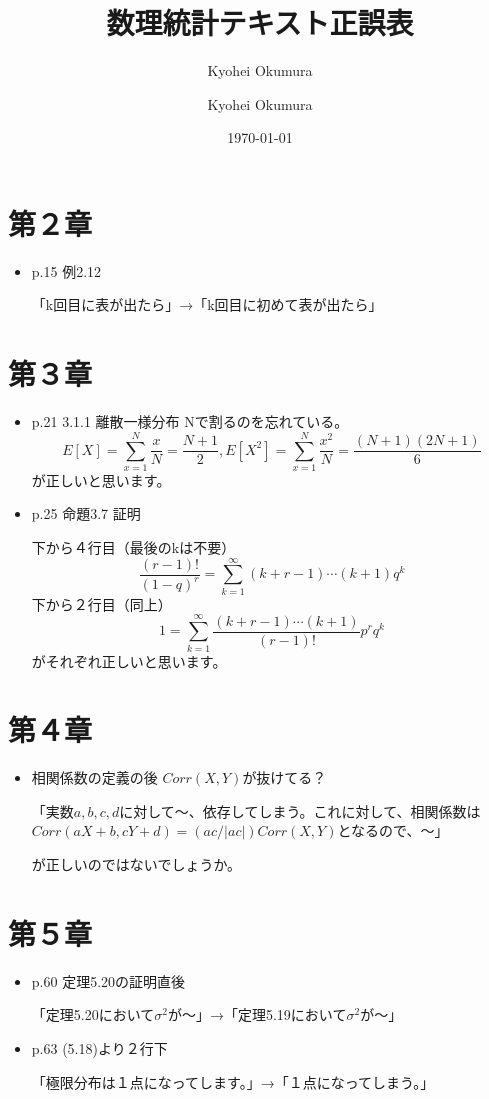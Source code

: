 \documentclass[11pt,a4paper]{article}
\author{Kyohei Okumura}
\begin{document}
\title{数理統計テキスト正誤表}
\author{Kyohei Okumura}
\date{\today}
\maketitle

\section*{第２章}

\begin{itemize}
\item p.15 例2.12

「k回目に表が出たら」→「k回目に初めて表が出たら」
\end{itemize}

\section*{第３章}
\begin{itemize}

\item p.21 3.1.1 離散一様分布 Nで割るのを忘れている。
$$E[X] = \displaystyle{\sum_{x=1}^N {\frac{x}{N}} = \frac{N+1}{2}, E[X^2] = \sum_{x=1}^N \frac{x^2}{N} = \frac{(N+1)(2N+1)}{6}}$$
が正しいと思います。

\item p.25 命題3.7 証明

下から４行目（最後のkは不要）
$$\displaystyle{\frac{(r-1)!}{(1-q)^r} = \sum_{k=1}^\infty (k+r-1) \cdots (k+1)q^k}$$
下から２行目（同上）
$$1 = \displaystyle{\sum_{k=1}^\infty \frac{(k+r-1) \cdots (k+1)}{(r-1)!}p^r q^k}$$
がそれぞれ正しいと思います。

\end{itemize}

\section*{第４章}
\begin{itemize}

\item 相関係数の定義の後 $Corr(X,Y)$が抜けてる？

「実数$a,b,c,d$に対して～、依存してしまう。これに対して、相関係数は$Corr(aX+b, cY+d) = (ac/|ac|) Corr(X,Y)$となるので、～」

が正しいのではないでしょうか。


\end{itemize}

\section*{第５章}
\begin{itemize}

\item p.60 定理5.20の証明直後

「定理5.20において$\sigma^2$が～」→「定理5.19において$\sigma^2$が～」

\item p.63 (5.18)より２行下

「極限分布は１点になってします。」→「１点になってしまう。」

\end{itemize}
\end{document}
